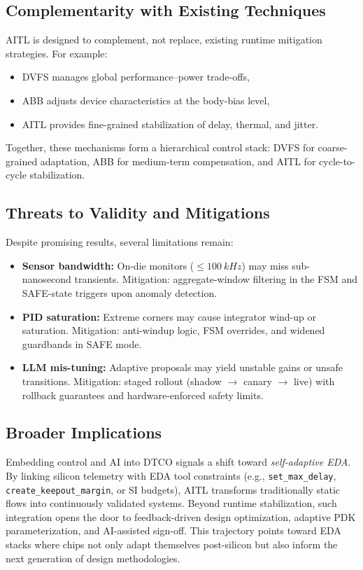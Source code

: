 \documentclass[conference]{IEEEtran}
\begin{document}
\subsection{Complementarity with Existing Techniques}
AITL is designed to complement, not replace, existing runtime mitigation strategies. For example:
\begin{itemize}
  \item DVFS manages global performance–power trade-offs,
  \item ABB adjusts device characteristics at the body-bias level,
  \item AITL provides fine-grained stabilization of delay, thermal, and jitter.
\end{itemize}
Together, these mechanisms form a hierarchical control stack: DVFS for coarse-grained adaptation, ABB for medium-term compensation, and AITL for cycle-to-cycle stabilization.

\subsection{Threats to Validity and Mitigations}
Despite promising results, several limitations remain:
\begin{itemize}
  \item \textbf{Sensor bandwidth:} On-die monitors ($\leq \SI{100}{kHz}$) may miss sub-nanosecond transients. Mitigation: aggregate-window filtering in the FSM and SAFE-state triggers upon anomaly detection.
  \item \textbf{PID saturation:} Extreme corners may cause integrator wind-up or saturation. Mitigation: anti-windup logic, FSM overrides, and widened guardbands in SAFE mode.
  \item \textbf{LLM mis-tuning:} Adaptive proposals may yield unstable gains or unsafe transitions. Mitigation: staged rollout (shadow $\rightarrow$ canary $\rightarrow$ live) with rollback guarantees and hardware-enforced safety limits.
\end{itemize}

\subsection{Broader Implications}
Embedding control and AI into DTCO signals a shift toward \emph{self-adaptive EDA}. By linking silicon telemetry with EDA tool constraints (e.g., \texttt{set\_max\_delay}, \texttt{create\_keepout\_margin}, or SI budgets), AITL transforms traditionally static flows into continuously validated systems. Beyond runtime stabilization, such integration opens the door to feedback-driven design optimization, adaptive PDK parameterization, and AI-assisted sign-off. This trajectory points toward EDA stacks where chips not only adapt themselves post-silicon but also inform the next generation of design methodologies.
\end{document}
